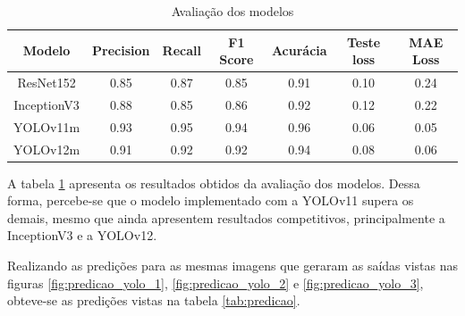         \begin{table}[!htb]
            \begin{tabular}{| c | c | c | c | c | c | c |}
                \hline
                Modelo      & Precision & Recall & F1 Score & Acurácia & Teste loss & MAE Loss \\
                \hline
                ResNet152 & 0.85 & 0.87 & 0.85 & 0.91 & 0.10 & 0.24 \\
                InceptionV3 & 0.88 & 0.85 & 0.86 & 0.92 & 0.12 & 0.22 \\
                YOLOv11m & 0.93 & 0.95 & 0.94 & 0.96 & 0.06 & 0.05    \\
                YOLOv12m & 0.91 & 0.92 & 0.92 & 0.94 & 0.08 & 0.06 \\
                \hline
            \end{tabular}
            \caption{Avaliação dos modelos}
            \label{tab:avaliacao}
        \end{table}

        A tabela \ref{tab:avaliacao} apresenta os resultados obtidos da avaliação dos modelos. Dessa forma, percebe-se que o modelo implementado com a YOLOv11 supera os demais, mesmo que ainda apresentem resultados competitivos, principalmente a InceptionV3 e a YOLOv12. 

        Realizando as predições para as mesmas imagens que geraram as saídas vistas nas figuras \ref{fig:predicao_yolo_1}, \ref{fig:predicao_yolo_2} e \ref{fig:predicao_yolo_3}, obteve-se as predições vistas na tabela \ref{tab:predicao}.        

